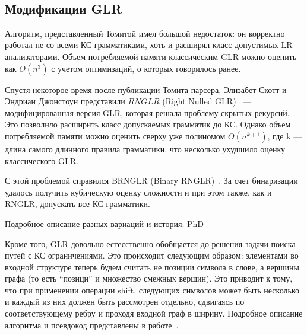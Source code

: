 \begin{example}
\begin{enumerate}
        \\
    \end{enumerate}



\end{example}

\subsection{Модификации GLR}
Алгоритм, представленный Томитой имел большой недостаток: он корректно работал не со всеми КС грамматиками, хоть и расширял класс допустимых LR анализаторами. Объем потребляемой памяти классическим GLR можно оценить как $ O(n^3)$ с учетом оптимизаций, о которых говорилось ранее.

Спустя некоторое время после публикации Томита-парсера, Элизабет Скотт и Эндриан Джонстоун представили $RNGLR$ (Right Nulled GLR)~\cite{Scott:2006:RNG:1146809.1146810} --- модифицированная версия GLR, которая решала проблему скрытых рекурсий. Это позволило расширить класс допускаемых грамматик до КС. Однако объем потребляемой памяти можно оценить сверху уже полиномом $O(n^{k+1})$, где k --- длина самого длинного правила грамматики, что несколько ухудшило оценку классического GLR.

С этой проблемой справился BRNGLR (Binary RNGLR)~\cite{Scott:2007:BCT:1289813.1289815}. За счет бинаризации удалось получить кубическую оценку сложности и при этом также, как и RNGLR, допускать все КС грамматики.

Подробное описание разных вариаций и история: PhD~\cite{Economopoulos2006GeneralisedLP}

Кроме того, GLR довольно естесственно обобщается до решения задачи поиска путей с КС ограничениями. Это происходит следующим образом: элементами во входной структуре теперь будем считать не позиции символа в слове, а вершины графа (то есть ``позици'' и множество смежных вершин). Это приводит к тому, что при применении операции shift, следующих символов может быть несколько и каждый из них должен быть рассмотрен отдельно, сдвигаясь по соответствующему ребру и проходя входной граф в ширину. Подробное описание алгоритма и псевдокод представлены в работе~\cite{10.1007/978-3-319-41579-6_22}.


